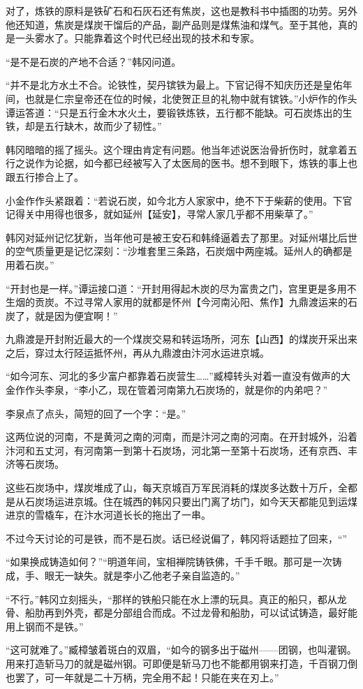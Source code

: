 对了，炼铁的原料是铁矿石和石灰石还有焦炭，这也是教科书中插图的功劳。另外他还知道，焦炭是煤炭干馏后的产品，副产品则是煤焦油和煤气。至于其他，真的是一头雾水了。只能靠着这个时代已经出现的技术和专家。

“是不是石炭的产地不合适？”韩冈问道。

“并不是北方水土不合。论铁性，契丹镔铁为最上。下官记得不知庆历还是皇佑年间，也就是仁宗皇帝还在位的时候，北使贺正旦的礼物中就有镔铁。”小炉作的作头谭运答道：“只是五行金木水火土，要锻铁炼铁，五行都不能缺。可石炭炼出的生铁，却是五行缺木，故而少了韧性。”

韩冈暗暗的摇了摇头。这个理由肯定有问题。他当年述说医治骨折伤时，就拿着五行之说作为论据，如今都已经被写入了太医局的医书。想不到眼下，炼铁的事上也跟五行掺合上了。

小金作作头紧跟着：“若说石炭，如今北方人家家中，绝不下于柴薪的使用。下官记得关中用得也很多，就如延州【延安】，寻常人家几乎都不用柴草了。”

韩冈对延州记忆犹新，当年他可是被王安石和韩绛逼着去了那里。对延州堪比后世的空气质量更是记忆深刻：“沙堆套里三条路，石炭烟中两座城。延州人的确都是用着石炭。”

“开封也是一样。”谭运接口道：“开封用得起木炭的尽为富贵之门，宫里更是多用不生烟的贡炭。不过寻常人家用的就都是怀州【今河南沁阳、焦作】九鼎渡运来的石炭了，就是因为便宜啊！”

九鼎渡是开封附近最大的一个煤炭交易和转运场所，河东【山西】的煤炭开采出来之后，穿过太行陉运抵怀州，再从九鼎渡由汴河水运进京城。

“如今河东、河北的多少富户都靠着石炭营生……”臧樟转头对着一直没有做声的大金作作头李泉，“李小乙，现在管着河南第九石炭场的，就是你的内弟吧？”

李泉点了点头，简短的回了一个字：“是。”

这两位说的河南，不是黄河之南的河南，而是汴河之南的河南。在开封城外，沿着汴河和五丈河，有河南第一到第十石炭场，河北第一至第十石炭场，还有京西、丰济等石炭场。

这些石炭场中，煤炭堆成了山，每天京城百万军民消耗的煤炭多达数十万斤，全都是从石炭场运进京城。住在城西的韩冈只要出门离了坊门，如今天天都能见到运煤进京的雪橇车，在汴水河道长长的拖出了一串。

不过今天讨论的可是铁，而不是石炭。话已经说偏了，韩冈将话题拉了回来，“”

“如果换成铸造如何？”“明道年间，宝相禅院铸铁佛，千手千眼。那可是一次铸成，手、眼无一缺失。就是李小乙他老子亲自监造的。”

“不行。”韩冈立刻摇头，“那样的铁船只能在水上漂的玩具。真正的船只，都从龙骨、船肋再到外壳，都是分部组合而成。不过龙骨和船肋，可以试试铸造，最好能用上钢而不是铁。”

“这可就难了。”臧樟皱着斑白的双眉，“如今的钢多出于磁州——团钢，也叫灌钢。用来打造斩马刀的就是磁州钢。可即便是斩马刀也不能都用钢来打造，千百钢刀倒也罢了，可一年就是二十万柄，完全用不起！只能在夹在刃上。”

